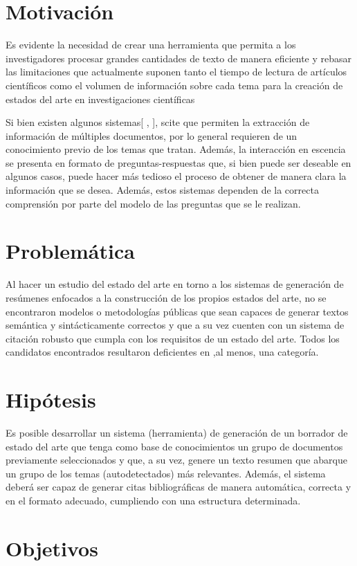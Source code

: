 \section{Motivación}
    Es evidente la necesidad de crear una herramienta que permita a los investigadores procesar grandes cantidades de texto de manera eficiente y rebasar las limitaciones que actualmente suponen tanto el tiempo de lectura de artículos científicos como el volumen de información sobre cada tema para la creación de estados del arte en investigaciones científicas

    Si bien existen algunos sistemas[\cite{elicit} , \cite{scite}], scite que permiten la extracción de información de múltiples documentos, por lo general requieren de un conocimiento previo de los temas que tratan. Además, la interacción en escencia se presenta en formato de preguntas-respuestas que, si bien puede ser deseable en algunos casos, puede hacer más tedioso el proceso de obtener de manera clara la información que se desea. Además, estos sistemas dependen de la correcta comprensión por parte del modelo de las preguntas que se le realizan.

\section{Problemática}
    Al hacer un estudio del estado del arte en torno a los sistemas de generación de resúmenes enfocados a la construcción de los propios estados del arte, no se encontraron modelos o metodologías públicas que sean capaces de generar textos semántica y sintácticamente correctos y que a su vez cuenten con un sistema de citación robusto que cumpla con los requisitos de un estado del arte. Todos los candidatos encontrados resultaron deficientes en ,al menos, una categoría.

\section{Hipótesis}
    Es posible desarrollar un sistema (herramienta) de generación de un borrador de estado del arte que tenga como base de conocimientos un grupo de documentos previamente seleccionados y que, a su vez, genere un texto resumen que abarque un grupo de los temas (autodetectados) más relevantes. Además, el sistema deberá ser capaz de generar citas bibliográficas de manera automática, correcta y en el formato adecuado, cumpliendo con una estructura determinada.

\section{Objetivos}
